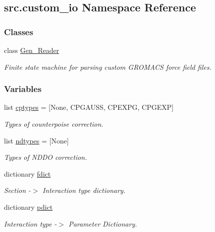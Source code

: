 \hypertarget{namespacesrc_1_1custom__io}{}\subsection{src.\+custom\+\_\+io Namespace Reference}
\label{namespacesrc_1_1custom__io}
\subsubsection*{Classes}
\begin{DoxyCompactItemize}
\item 
class \hyperlink{classsrc_1_1custom__io_1_1Gen__Reader}{Gen\+\_\+\+Reader}
\begin{DoxyCompactList}\small\item\em Finite state machine for parsing custom G\+R\+O\+M\+A\+CS force field files. \end{DoxyCompactList}\end{DoxyCompactItemize}
\subsubsection*{Variables}
\begin{DoxyCompactItemize}
\item 
list \hyperlink{namespacesrc_1_1custom__io_a5700a00b2f3a5bfa169a5f4e3526dc80}{cptypes} = \mbox{[}None, \textquotesingle{}C\+P\+G\+A\+U\+SS\textquotesingle{}, \textquotesingle{}C\+P\+E\+X\+PG\textquotesingle{}, \textquotesingle{}C\+P\+G\+E\+XP\textquotesingle{}\mbox{]}
\begin{DoxyCompactList}\small\item\em Types of counterpoise correction. \end{DoxyCompactList}\item 
list \hyperlink{namespacesrc_1_1custom__io_a5283333b4e623e0fdf572c416dfa2c3e}{ndtypes} = \mbox{[}None\mbox{]}
\begin{DoxyCompactList}\small\item\em Types of N\+D\+DO correction. \end{DoxyCompactList}\item 
dictionary \hyperlink{namespacesrc_1_1custom__io_af4efc534146ecb0b0d70c73fa4007159}{fdict}
\begin{DoxyCompactList}\small\item\em Section -\/$>$ Interaction type dictionary. \end{DoxyCompactList}\item 
dictionary \hyperlink{namespacesrc_1_1custom__io_a32bbeb2bf67c2dcc1d953f8f844541a5}{pdict}
\begin{DoxyCompactList}\small\item\em Interaction type -\/$>$ Parameter Dictionary. \end{DoxyCompactList}\end{DoxyCompactItemize}


